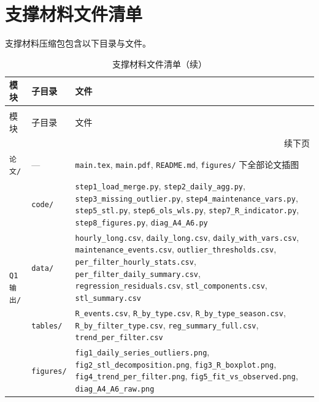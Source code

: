 \documentclass[12pt, a4paper, fontset=fandol]{ctexart}
\theoremstyle{definition}
\begin{document}
\section{支撑材料文件清单}

支撑材料压缩包包含以下目录与文件。

\begingroup
\footnotesize
\renewcommand{\arraystretch}{1.15}
\begin{longtable}{p{}p{}p{}}
\caption{支撑材料文件清单}\\
\toprule
模块 & 子目录 & 文件 \\
\midrule
\endfirsthead
\caption[]{支撑材料文件清单（续）}\\
\toprule
模块 & 子目录 & 文件 \\
\midrule
\endhead
\midrule
\multicolumn{3}{r}{续下页} \\
\endfoot
\bottomrule
\endlastfoot

\texttt{论文/} & --- &
  \texttt{main.tex}, \texttt{main.pdf}, \texttt{README.md}, \texttt{figures/} 下全部论文插图 \\
\midrule

\multirow{4}{*}{\texttt{Q1输出/}}
  & \texttt{code/} &
    \texttt{step1\_load\_merge.py}, \texttt{step2\_daily\_agg.py}, \texttt{step3\_missing\_outlier.py}, \texttt{step4\_maintenance\_vars.py}, \texttt{step5\_stl.py}, \texttt{step6\_ols\_wls.py}, \texttt{step7\_R\_indicator.py}, \texttt{step8\_figures.py}, \texttt{diag\_A4\_A6.py} \\
  & \texttt{data/} &
    \texttt{hourly\_long.csv}, \texttt{daily\_long.csv}, \texttt{daily\_with\_vars.csv}, \texttt{maintenance\_events.csv}, \texttt{outlier\_thresholds.csv}, \texttt{per\_filter\_hourly\_stats.csv}, \texttt{per\_filter\_daily\_summary.csv}, \texttt{regression\_residuals.csv}, \texttt{stl\_components.csv}, \texttt{stl\_summary.csv} \\
  & \texttt{tables/} &
    \texttt{R\_events.csv}, \texttt{R\_by\_type.csv}, \texttt{R\_by\_type\_season.csv}, \texttt{R\_by\_filter\_type.csv}, \texttt{reg\_summary\_full.csv}, \texttt{trend\_per\_filter.csv} \\
  & \texttt{figures/} &
    \texttt{fig1\_daily\_series\_outliers.png}, \texttt{fig2\_stl\_decomposition.png}, \texttt{fig3\_R\_boxplot.png}, \texttt{fig4\_trend\_per\_filter.png}, \texttt{fig5\_fit\_vs\_observed.png}, \texttt{diag\_A4\_A6\_raw.png} \\
\midrule


\end{longtable}
\end{document}
